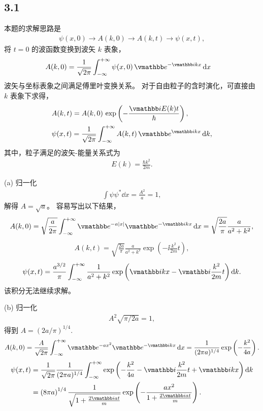 \subsection{3.1}
本题的求解思路是
\begin{align}
    \psi(x,0) \rightarrow A(k,0) \rightarrow A(k,t) \rightarrow \psi(x,t),
\end{align}
将 $t=0$ 的波函数变换到波矢 $k$ 表象，
\begin{align}
    &A(k,0) = \frac1{\sqrt{2\pi}} \intinf \psi(x,0) \, \ee^{-\ii k x} \, \dd x
\end{align}
波矢与坐标表象之间满足傅里叶变换关系。
对于自由粒子的含时演化，可直接由 $k$ 表象下求得，
\begin{align}
    &A(k,t) = A(k,0)\, \exp\left(-\frac{\ii E(k) t}\hbar\right), \\
    &\psi(x,t) = \frac{1}{\sqrt{2\pi}} \intinf A(k,t)\, \ee^{\ii kx} \, \dd k,
\end{align}
其中，粒子满足的波矢-能量关系式为
\begin{align}
    E(k) = \frac{\hbar k^2}{2m}. 
\end{align}

(a) 归一化
\begin{align}
    \int \psi \psi^* \dd x = \frac{A^2}a = 1,
\end{align}
解得 $A = \sqrt a$。
容易写出以下结果，
\begin{align}
    A(k,0) = \sqrt{\frac{a}{2\pi}} \intinf \ee^{-a|x|}\ee^{-\ii k x} \, \dd x = \sqrt{\frac{2a}\pi} \frac{a}{a^2 + k^2},
\end{align}
\begin{align}
    A(k,t) = \sqrt{\frac{2a}\pi} \frac{a}{a^2 + k^2} \exp \left( - \ii \frac{k^2}{2m} t\right),
\end{align}
\begin{align}
    \psi(x,t) = \frac{a^{3/2}}{\pi} \intinf \frac1{a^2 + k^2} \exp\left( \ii k x - \ii \frac{k^2}{2m} t\right) \dd k. 
\end{align}
该积分无法继续求解。

(b) 归一化
\begin{align}
    A^2 \sqrt{\pi/2a} = 1,
\end{align}
得到 $A = (2a/\pi)^{1/4}$.
\begin{align}
    A(k,0) = \frac{A}{\sqrt{2\pi}} \intinf \ee^{-a x^2} \ee^{-\ii k x}\, \dd x = \frac1{(2\pi a)^{1/4}} \exp\left(-\frac{k^2}{4a}\right). 
\end{align}
\begin{align}
    \psi(x,t) &= \frac{1}{\sqrt{2\pi}} \frac1{(2\pi a)^{1/4}} \intinf \exp\left(- \frac{k^2}{4a} - \ii \frac{k^2}{2m}t + \ii k x\right) \dd k \\
    &= \left(8\pi a\right)^{1/4} \frac1{\sqrt{1 + \frac{2\ii a t}{m}}} \exp\left(- \frac{ax^2}{1 + \frac{2\ii at}{m}}\right). 
\end{align}

